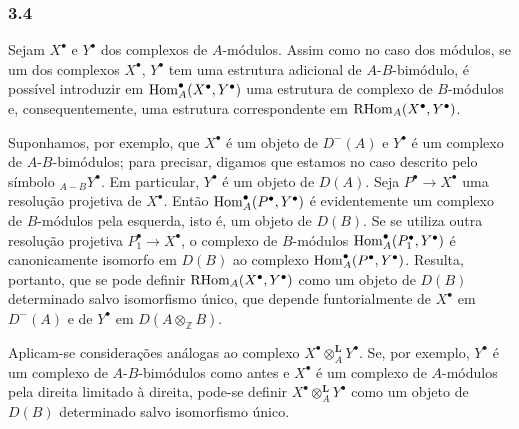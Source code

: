 \subsubsection*{3.4}

Sejam $X^\bullet$ e $Y^\bullet$ dos complexos de $A$-módulos. Assim como no caso dos módulos, se um dos complexos $X^\bullet$, $Y^\bullet$ tem uma estrutura adicional de $A$-$B$-bimódulo, é possível introduzir em $\operatorname{Hom}_A^\bullet(X^\bullet,Y^\bullet)$ uma estrutura de complexo de $B$-módulos e, consequentemente, uma estrutura correspondente em $\mathrm{RHom}_A(X^\bullet,Y^\bullet)$.

Suponhamos, por exemplo, que $X^\bullet$ é um objeto de $D^-(A)$ e $Y^\bullet$ é um complexo de $A$-$B$-bimódulos; para precisar, digamos que estamos no caso descrito pelo símbolo ${}_{A-B}Y^\bullet$. Em particular, $Y^\bullet$ é um objeto de $D(A)$. Seja $P^\bullet\to X^\bullet$ uma resolução projetiva de $X^\bullet$. Então $\operatorname{Hom}_A^\bullet(P^\bullet,Y^\bullet)$ é evidentemente um complexo de $B$-módulos pela esquerda, isto é, um objeto de $D(B)$. Se se utiliza outra resolução projetiva $P_1^\bullet\to X^\bullet$, o complexo de $B$-módulos $\operatorname{Hom}_A^\bullet(P_1^\bullet,Y^\bullet)$ é canonicamente isomorfo em $D(B)$ ao complexo $\operatorname{Hom}_A^\bullet(P^\bullet,Y^\bullet)$. Resulta, portanto, que se pode definir $\mathrm{RHom}_A(X^\bullet,Y^\bullet)$ como um objeto de $D(B)$ determinado salvo isomorfismo único, que depende funtorialmente de $X^\bullet$ em $D^-(A)$ e de $Y^\bullet$ em $D(A\otimes_{\mathbb Z}B)$.

Aplicam-se considerações análogas ao complexo $X^\bullet\otimes_A^{\mathbf L}Y^\bullet$. Se, por exemplo, $Y^\bullet$ é um complexo de $A$-$B$-bimódulos como antes e $X^\bullet$ é um complexo de $A$-módulos pela direita limitado à direita, pode-se definir $X^\bullet\otimes_A^{\mathbf L}Y^\bullet$ como um objeto de $D(B)$ determinado salvo isomorfismo único.
